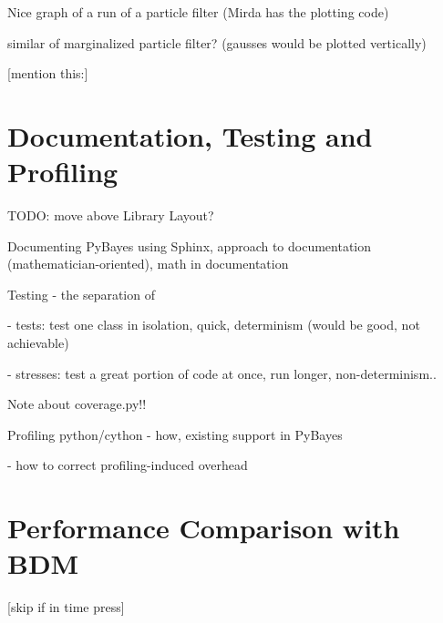 Nice graph of a run of a particle filter (Mirda has the plotting code)

similar of marginalized particle filter? (gausses would be plotted vertically)

[mention this:\cite{Smi:10}]

\section{Documentation, Testing and Profiling} \label{sec:PyBayesDocsTests}

TODO: move above Library Layout?

Documenting PyBayes using Sphinx, approach to documentation (mathematician-oriented), math in documentation

Testing - the separation of

- tests: test one class in isolation, quick, determinism (would be good, not achievable)

- stresses: test a great portion of code at once, run longer, non-determinism..

Note about coverage.py!!

Profiling python/cython - how, existing support in PyBayes

- how to correct profiling-induced overhead

\section{Performance Comparison with BDM} \label{sec:PyBayesPerformance}

[skip if in time press]
